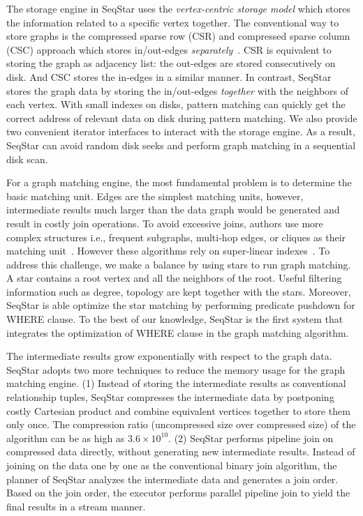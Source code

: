 The storage engine in SeqStar uses the \emph{vertex-centric storage model} which stores the information related to a specific vertex together.
The conventional way to store graphs is the compressed sparse row (CSR) and compressed sparse column (CSC) approach which stores in/out-edges \emph{separately}~\cite{DBLP:conf/sc/PearceGA10,DBLP:conf/osdi/KyrolaBG12}.
CSR is equivalent to storing the graph as adjacency list: the out-edges are stored consecutively on disk.
And CSC stores the in-edges in a similar manner.
In contrast, SeqStar stores the graph data by storing the in/out-edges \emph{together} with the neighbors of each vertex.
With small indexes on disks, pattern matching can quickly get the correct address of relevant data on disk during pattern matching.
We also provide two convenient iterator interfaces to interact with the storage engine.
As a result, SeqStar can avoid random disk seeks and perform graph matching in a sequential disk scan.

For a graph matching engine, the most fundamental problem is to determine the basic matching unit.
Edges are the simplest matching units, however, intermediate results much larger than the data graph would be generated and result in costly join operations.
To avoid excessive joins, authors use more complex structures i.e.,
frequent subgraphs, multi-hop edges, or cliques as their matching unit~\cite{DBLP:conf/sigmod/HeS08,DBLP:conf/edbt/ZhangLY09,DBLP:journals/pvldb/QiaoZC17}.
However these algorithms rely on super-linear indexes~\cite{DBLP:journals/pvldb/SunWWSL12}.
To address this challenge, we make a balance by using stars to run graph matching.
A star contains a root vertex and all the neighbors of the root.
Useful filtering information such as degree, topology are kept together with the stars.
Moreover, SeqStar is able optimize the star matching by performing predicate pushdown for WHERE clause.
To the best of our knowledge, SeqStar is the first system that integrates the optimization of WHERE clause in the graph matching algorithm.

The intermediate results grow exponentially with respect to the graph data.
SeqStar adopts two more techniques to reduce the memory usage for the graph matching engine.
(1) Instead of storing the intermediate results as conventional relationship tuples,
SeqStar compresses the intermediate data by postponing costly Cartesian product and combine equivalent vertices together to store them only once.
The compression ratio (uncompressed size over compressed size) of the algorithm can be as high as $3.6 \times 10^{10}$.
(2) SeqStar performs pipeline join on compressed data directly, without generating new intermediate results.
Instead of joining on the data one by one as the conventional binary join algorithm,
the planner of SeqStar analyzes the intermediate data and generates a join order.
Based on the join order, the executor performs parallel pipeline join to yield the final results in a stream manner.

